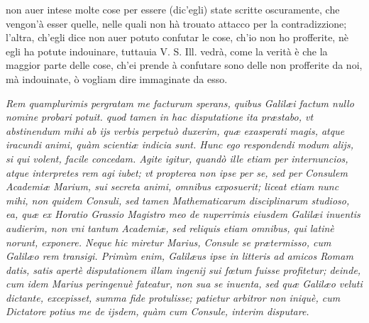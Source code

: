 \documentclass[11pt,twoside,openany]{book}
\begin{document}
non auer intese molte cose per essere (dic'egli) state scritte oscuramente, che vengon'à esser quelle, nelle quali non hà trouato attacco per la contradizzione; l'altra, ch'egli dice non auer potuto confutar le cose, ch'io non ho profferite, nè egli ha potute indouinare, tuttauia V. S. Ill. vedrà, come la verità è che la maggior parte delle cose, ch'ei prende à confutare sono delle non profferite da noi, mà indouinate, ò vogliam dire immaginate da esso.



\par\bigskip\noindent{}\enspace \textit{Rem quamplurimis pergratam me facturum sperans, quibus Galilæi factum nullo nomine probari potuit. quod tamen in hac disputatione ita præstabo, vt abstinendum mihi ab ijs verbis perpetuò duxerim, quæ exasperati magis, atque iracundi animi, quàm scientiæ indicia sunt. Hunc ego respondendi modum alijs, si qui volent, facile concedam. Agite igitur, quandò ille etiam per internuncios, atque interpretes rem agi iubet; vt propterea non ipse per se, sed per Consulem Academiæ Marium, sui secreta animi, omnibus exposuerit; liceat etiam nunc mihi, non quidem Consuli, sed tamen Mathematicarum disciplinarum studioso, ea, quæ ex Horatio Grassio Magistro meo de nuperrimis eiusdem Galilæi inuentis audierim, non vni tantum Academiæ, sed reliquis etiam omnibus, qui latinè norunt, exponere. Neque hic miretur Marius, Consule se prætermisso, cum Galilæo rem transigi. Primùm enim, Galilæus ipse in litteris ad amicos Romam datis, satis apertè disputationem illam ingenij sui fœtum fuisse profitetur; deinde, cum idem Marius peringenuè fateatur, non sua se inuenta, sed quæ Galilæo veluti dictante, excepisset, summa fide protulisse; patietur arbitror non iniquè, cum Dictatore potius me de ijsdem, quàm cum Consule, interim disputare.}
\end{document}

